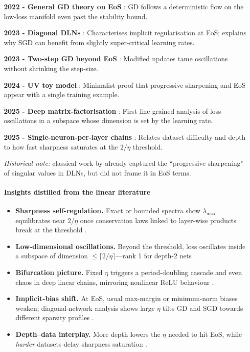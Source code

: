 \documentclass[11pt]{article}
\begin{document}
\textbf{2022 - General GD theory on EoS} \citep{Arora2022Understanding}: GD follows a deterministic flow on the low-loss manifold even past the stability bound.

\textbf{2023 - Diagonal DLNs} \citep{Labarriere2024DiagonalDLN}: Characterises implicit regularisation at EoS; explains why SGD can benefit from slightly super-critical learning rates.

\textbf{2023 - Two-step GD beyond EoS} \citep{Chen2023TwoStep}: Modified updates tame oscillations without shrinking the step-size.

\textbf{2024 - UV toy model} \citep{Kalra2023Universal}: Minimalist proof that progressive sharpening and EoS appear with a single training example.

\textbf{2025 - Deep matrix-factorisation} \citep{Ghosh2025DeepMF}: First fine-grained analysis of loss oscillations in a subspace whose dimension is set by the learning rate.

\textbf{2025 - Single-neuron-per-layer chains} \citep{Yoo2025SingleNeuron}: Relates dataset difficulty and depth to how fast sharpness saturates at the $2/\eta$ threshold.

\vspace{0.5em}
\noindent
\emph{Historical note:} classical work by \citet{saxe2013exact} already
captured the ``progressive sharpening'' of singular values in DLNs, but
did not frame it in EoS terms.

\paragraph{Insights distilled from the linear literature}

\begin{itemize}
\item \textbf{Sharpness self-regulation.}  Exact or bounded spectra show
      $\lambda_{\max}$ equilibrates near $2/\eta$ once conservation laws
      linked to layer-wise products break at the threshold
      \citep{Ghosh2025DeepMF}.%
\item \textbf{Low-dimensional oscillations.}  Beyond the threshold, loss
      oscillates inside a subspace of dimension
      $\le\lceil2/\eta\rceil$—rank 1 for depth-2 nets
      \citep{Li2022SharpnessEoS}.%
\item \textbf{Bifurcation picture.}  Fixed $\eta$ triggers a
      period-doubling cascade and even chaos in deep linear chains,
      mirroring nonlinear ReLU behaviour
      \citep{Ghosh2025DeepMF,Kalra2023Universal}.%
\item \textbf{Implicit-bias shift.}  At EoS, usual max-margin or
      minimum-norm biases weaken; diagonal-network analysis shows large
      $\eta$ tilts GD and SGD towards different sparsity profiles
      \citep{Labarriere2024DiagonalDLN}.%
\item \textbf{Depth–data interplay.}  More depth lowers the $\eta$
      needed to hit EoS, while \emph{harder} datasets delay sharpness
      saturation \citep{Yoo2025SingleNeuron}.%
\end{itemize}
\end{document}
